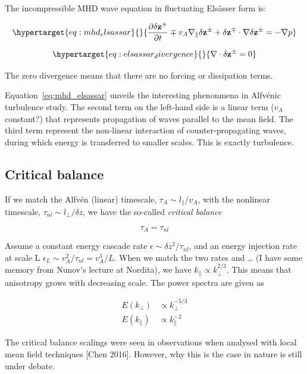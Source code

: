\documentclass[
  notoc %
]{tufte-book}
\begin{document}
The incompressible MHD wave equation in fluctuating Elsässer form is:

\begin{equation}\protect\hypertarget{eq:mhd_elsassar}{}{
\frac{\partial\delta\mathbf{z}^\pm}{\partial t} \mp v_A\nabla_\parallel\delta\mathbf{z}^\pm + \delta\mathbf{z}^\mp\cdot\nabla\delta\mathbf{z}^\pm = -\nabla p
}\label{eq:mhd_elsassar}\end{equation}

\begin{equation}\protect\hypertarget{eq:elsassar_divergence}{}{
\nabla\cdot\delta\mathbf{z}^\pm = 0
}\label{eq:elsassar_divergence}\end{equation}

The zero divergence means that there are no forcing or dissipation
terms.

Equation~\ref{eq:mhd_elsassar} unveils the interesting phenonmena in
Alfvénic turbulence study. The second term on the left-hand side is a
linear term (\(v_A\) constant?) that represents propagation of waves
parallel to the mean field. The third term represent the non-linear
interaction of counter-propagating waves, during which energy is
transferred to smaller scales. This is exactly turbulence.

\hypertarget{critical-balance}{%
\subsection{Critical balance}\label{critical-balance}}

If we match the Alfvén (linear) timescale,
\(\tau_A \sim l_\parallel/v_A\), with the nonlinear timescale,
\(\tau_{nl}\sim l_\perp/\delta z\), we have the so-called \emph{critical
balance}

\[
\tau_A = \tau_{nl}
\]

Assume a constant energy cascade rate
\(\epsilon\sim \delta z^2/\tau_{nl}\), and an energy injection rate at
scale L \(\epsilon_L\sim v_A^2/\tau_{nl}=v_A^3/L\). When we match the
two rates and \ldots{} (I have some memory from Nunov's lecture at
Nordita), we have \(k_\parallel\propto k_\perp^{2/3}\). This means that
anisotropy grows with decreasing scale. The power spectra are given as

\[
\begin{aligned}
E(k_\perp) &\propto k_\perp^{-5/3} \\
E(k_\parallel) &\propto k_\parallel^{-2}
\end{aligned}
\]

The critical balance scalings were seen in observations when analysed
with local mean field techniques {[}Chen 2016{]}. However, why this is
the case in nature is still under debate.
\end{document}
